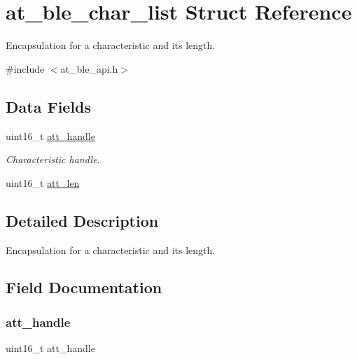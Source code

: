\hypertarget{structat__ble__char__list}{}\section{at\+\_\+ble\+\_\+char\+\_\+list Struct Reference}
\label{structat__ble__char__list}


Encapsulation for a characteristic and its length.  




{\ttfamily \#include $<$at\+\_\+ble\+\_\+api.\+h$>$}

\subsection*{Data Fields}
\begin{DoxyCompactItemize}
\item 
uint16\+\_\+t \mbox{\hyperlink{structat__ble__char__list_a8cd0cff3a116d6ef67f787ae3a6a48d4}{att\+\_\+handle}}
\begin{DoxyCompactList}\small\item\em Characteristic handle. \end{DoxyCompactList}\item 
uint16\+\_\+t \mbox{\hyperlink{structat__ble__char__list_a5dda30258d10935828949e9b5d7efb98}{att\+\_\+len}}
\end{DoxyCompactItemize}


\subsection{Detailed Description}
Encapsulation for a characteristic and its length. 

\subsection{Field Documentation}
\mbox{\label{structat__ble__char__list_a8cd0cff3a116d6ef67f787ae3a6a48d4}} 
\subsubsection{\texorpdfstring{att\_handle}{att\_handle}}
{\footnotesize\ttfamily uint16\+\_\+t att\+\_\+handle}



